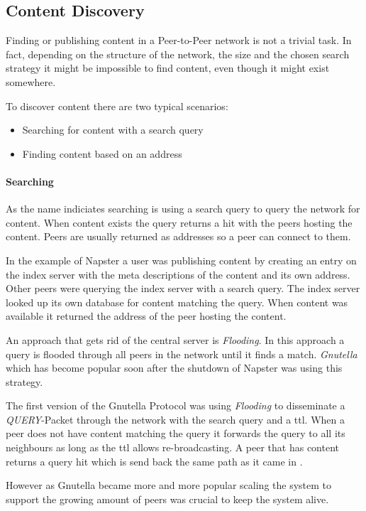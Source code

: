 \subsection{Content Discovery}
Finding or publishing content in a Peer-to-Peer network is not a trivial task. In fact, depending on the structure of the network, the size and the chosen search strategy it might be impossible to find content, even though it might exist somewhere.

To discover content there are two typical scenarios:
\begin{itemize}
  \item Searching for content with a search query
  \item Finding content based on an address
\end{itemize}

\paragraph{Searching}
As the name indiciates searching is using a search query to query the network for content. When content exists the query returns a hit with the peers hosting the content. Peers are usually returned as addresses so a peer can connect to them.

In the example of Napster a user was publishing content by creating an entry on the index server with the meta descriptions of the content and its own address. Other peers were querying the index server with a search query. The index server looked up its own database for content matching the query. When content was available it returned the address of the peer hosting the content. 

An approach that gets rid of the central server is \textit{Flooding}. In this approach a query is flooded through all peers in the network until it finds a match. \textit{Gnutella} which has become popular soon after the shutdown of Napster was using this strategy.

The first version of the Gnutella Protocol was using \textit{Flooding} to disseminate a \textit{QUERY}-Packet through the network with the search query and a \gls{ttl}. When a peer does not have content matching the query it forwards the query to all its neighbours as long as the \gls{ttl} allows re-broadcasting. A peer that has content returns a query hit which is send back the same path as it came in \cite[\S4]{gnutella04}.

However as Gnutella became more and more popular scaling the system to support the growing amount of peers was crucial to keep the system alive.  \cite[\S3.1]{gnutellaAnalysis}

